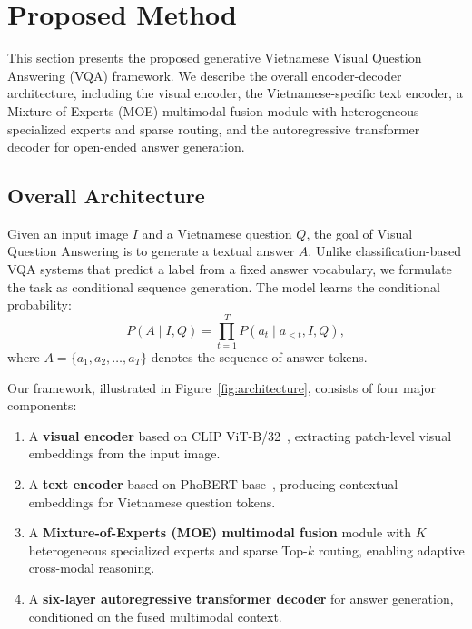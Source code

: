 \section{Proposed Method}
\label{sec:method}

This section presents the proposed generative Vietnamese Visual Question Answering (VQA) framework. We describe the overall encoder-decoder architecture, including the visual encoder, the Vietnamese-specific text encoder, a Mixture-of-Experts (MOE) multimodal fusion module with heterogeneous specialized experts and sparse routing, and the autoregressive transformer decoder for open-ended answer generation.

\subsection{Overall Architecture}
\label{sec:method:overview}

Given an input image $I$ and a Vietnamese question $Q$, the goal of Visual Question Answering is to generate a textual answer $A$. Unlike classification-based VQA systems that predict a label from a fixed answer vocabulary, we formulate the task as conditional sequence generation. The model learns the conditional probability:
\begin{equation}
    P(A \mid I, Q) = \prod_{t=1}^{T} P(a_t \mid a_{<t}, I, Q),
    \label{eq:conditional_gen}
\end{equation}
where $A = \{a_1, a_2, \ldots, a_T\}$ denotes the sequence of answer tokens.

Our framework, illustrated in Figure~\ref{fig:architecture}, consists of four major components:
\begin{enumerate}
    \item A \textbf{visual encoder} based on CLIP ViT-B/32~\cite{radford2021learning}, extracting patch-level visual embeddings from the input image.
    \item A \textbf{text encoder} based on PhoBERT-base~\cite{nguyen2020phobert}, producing contextual embeddings for Vietnamese question tokens.
    \item A \textbf{Mixture-of-Experts (MOE) multimodal fusion} module with $K$ heterogeneous specialized experts and sparse Top-$k$ routing, enabling adaptive cross-modal reasoning.
    \item A \textbf{six-layer autoregressive transformer decoder} for answer generation, conditioned on the fused multimodal context.
\end{enumerate}

